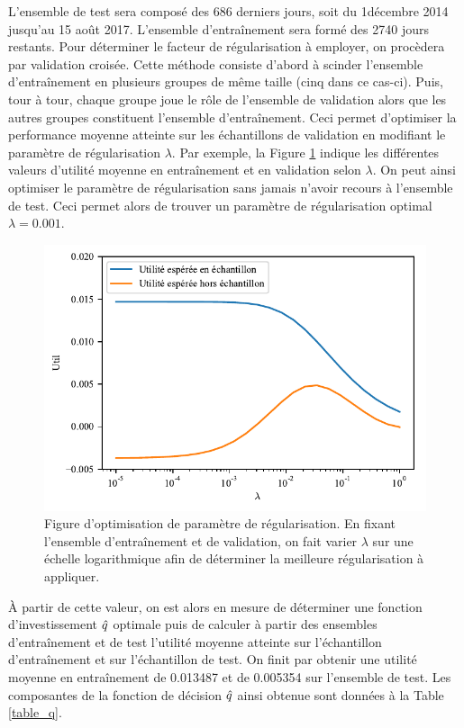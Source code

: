 L'ensemble de test sera composé des 686 derniers jours, soit du 1\ier décembre 2014
jusqu'au 15 août 2017. L'ensemble d'entraînement sera formé des 2740 jours restants. Pour
déterminer le facteur de régularisation à employer, on procèdera par validation
croisée. Cette méthode consiste d'abord à scinder l'ensemble d'entraînement en plusieurs
groupes de même taille (cinq dans ce cas-ci). Puis, tour à tour, chaque groupe joue le
rôle de l'ensemble de validation alors que les autres groupes constituent l'ensemble
d'entraînement. Ceci permet d'optimiser la performance moyenne atteinte sur les
échantillons de validation en modifiant le paramètre de régularisation $\lambda$. Par exemple,
la Figure \ref{fig_corr3} indique les différentes valeurs d'utilité moyenne en
entraînement et en validation selon $\lambda$. On peut ainsi optimiser le paramètre de
régularisation sans jamais n'avoir recours à l'ensemble de test. Ceci permet alors de
trouver un paramètre de régularisation optimal $\lambda = \num{0.001}$.


\begin{figure}
  \centering
  \includegraphics[width=\textwidth]{../experiments/fig/corr3.pdf}
  \caption[Optimisation de $\lambda$]{Figure d'optimisation de paramètre de régularisation. En
    fixant l'ensemble d'entraînement et de validation, on fait varier $\lambda$ sur une échelle
    logarithmique afin de déterminer la meilleure régularisation à appliquer.}
  \label{fig_corr3}
\end{figure}


À partir de cette valeur, on est alors en mesure de déterminer une fonction
d'investissement $\hat q$ optimale puis de calculer à partir des ensembles d'entraînement et
de test l'utilité moyenne atteinte sur l'échantillon d'entraînement et sur l'échantillon
de test. On finit par obtenir une utilité moyenne en entraînement de \num{0.013487} et de
\num{0.005354} sur l'ensemble de test. Les composantes de la fonction de décision $\hat q$
ainsi obtenue sont données à la Table \ref{table_q}.  



